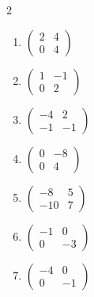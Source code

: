 \begin{multicols}{2}
\begin{enumerate}[label=\arabic*., leftmargin=*]
\item $\begin{pmatrix}2 & 4\\ 0 & 4\end{pmatrix}$
\item $\begin{pmatrix}1 & -1\\ 0 & 2\end{pmatrix}$
\item $\begin{pmatrix}-4 & 2\\ -1 & -1\end{pmatrix}$
\item $\begin{pmatrix}0 & -8\\ 0 & 4\end{pmatrix}$
\item $\begin{pmatrix}-8 & 5\\ -10 & 7\end{pmatrix}$
\item $\begin{pmatrix}-1 & 0\\ 0 & -3\end{pmatrix}$
\item $\begin{pmatrix}-4 & 0\\ 0 & -1\end{pmatrix}$
\end{enumerate}
\end{multicols}


